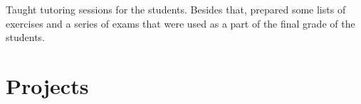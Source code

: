 \documentclass[]{deedy-resume-openfont}
\begin{document}
\begin{minipage}[t]{0.66\textwidth}
\begin{tightemize}
\item Taught tutoring sessions for the students. Besides that, prepared some lists of exercises and a series of exams that were used as a part of the final grade of the students.
\end{tightemize}







\section{Projects}


\end{minipage}
\end{document}
